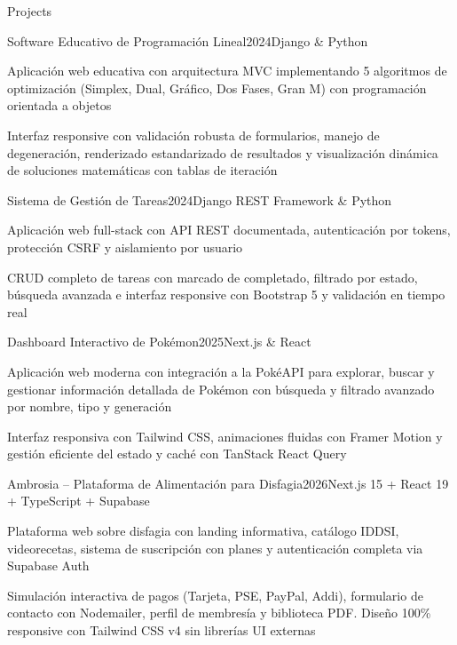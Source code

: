 \documentclass{resume} %
\begin{document}
\begin{rSection}{Projects}

\begin{rSubsection}{Software Educativo de Programaci\'on Lineal}{2024}{Django \& Python}{}

\item Aplicaci\'on web educativa con arquitectura MVC implementando 5 algoritmos de optimizaci\'on (Simplex, Dual, Gr\'afico, Dos Fases, Gran M) con programaci\'on orientada a objetos
\item Interfaz responsive con validaci\'on robusta de formularios, manejo de degeneraci\'on, renderizado estandarizado de resultados y visualizaci\'on din\'amica de soluciones matem\'aticas con tablas de iteraci\'on

\end{rSubsection}

\begin{rSubsection}{Sistema de Gesti\'on de Tareas}{2024}{Django REST Framework \& Python}{}

\item Aplicaci\'on web full-stack con API REST documentada, autenticaci\'on por tokens, protecci\'on CSRF y aislamiento por usuario
\item CRUD completo de tareas con marcado de completado, filtrado por estado, b\'usqueda avanzada e interfaz responsive con Bootstrap 5 y validaci\'on en tiempo real

\end{rSubsection}

\begin{rSubsection}{Dashboard Interactivo de Pok\'emon}{2025}{Next.js \& React}{}

\item Aplicaci\'on web moderna con integraci\'on a la Pok\'eAPI para explorar, buscar y gestionar informaci\'on detallada de Pok\'emon con b\'usqueda y filtrado avanzado por nombre, tipo y generaci\'on
\item Interfaz responsiva con Tailwind CSS, animaciones fluidas con Framer Motion y gesti\'on eficiente del estado y cach\'e con TanStack React Query

\end{rSubsection}

\begin{rSubsection}{Ambrosia -- Plataforma de Alimentaci\'on para Disfagia}{2026}{Next.js 15 + React 19 + TypeScript + Supabase}{}

\item Plataforma web sobre disfagia con landing informativa, cat\'alogo IDDSI, videorecetas, sistema de suscripci\'on con planes y autenticaci\'on completa via Supabase Auth
\item Simulaci\'on interactiva de pagos (Tarjeta, PSE, PayPal, Addi), formulario de contacto con Nodemailer, perfil de membres\'ia y biblioteca PDF. Dise\~no 100\% responsive con Tailwind CSS v4 sin librer\'ias UI externas

\end{rSubsection}

\end{rSection}
\end{document}
